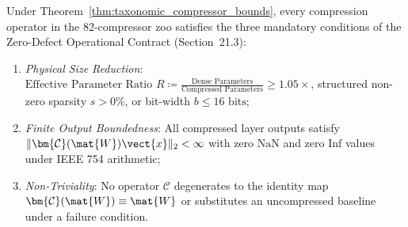 \begin{corollary}
\label{cor:82_compressor_contract_compliance}
Under Theorem~\ref{thm:taxonomic_compressor_bounds}, every compression operator in the 82-compressor zoo satisfies the three mandatory conditions of the \neuralops{} Zero-Defect Operational Contract (Section~21.3):
\begin{enumerate}
    \item \emph{Physical Size Reduction}: $\text{Effective Parameter Ratio } R \coloneqq \frac{\text{Dense Parameters}}{\text{Compressed Parameters}} \ge 1.05\times$, structured non-zero sparsity $s > 0\%$, or bit-width $b \le 16\text{ bits}$;
    \item \emph{Finite Output Boundedness}: All compressed layer outputs satisfy $\|\bm{\mathcal{C}}(\mat{W})\vect{x}\|_2 < \infty$ with zero $\text{NaN}$ and zero $\text{Inf}$ values under IEEE 754 arithmetic;
    \item \emph{Non-Triviality}: No operator $\bm{\mathcal{C}}$ degenerates to the identity map $\bm{\mathcal{C}}(\mat{W}) \equiv \mat{W}$ or substitutes an uncompressed baseline under a failure condition.
\end{enumerate}
\end{corollary}

